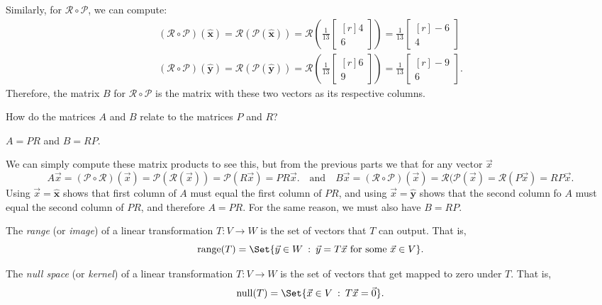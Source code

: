 \documentclass{problemset}
\DeclareMathOperator{\Range}{range}
\DeclareMathOperator{\Null}{null}
\newcommand{\xhat}{{\hat {\mathbf x}}}
\newcommand{\yhat}{{\hat {\mathbf y}}}
\newcommand{\mat}[1]{\begin{bmatrix*}[r]#1\end{bmatrix*}}
\providecommand\given{}
\newcommand\SetSymbol[1][]{%
	\nonscript\::%
	\allowbreak
	\nonscript\:
	\mathopen{}}
\renewcommand\given{\SetSymbol[\delimsize]}
\begin{document}
\begin{parts}
\begin{solution}
				Similarly, for $\mathcal R\circ \mathcal P$, we can compute:
				\begin{gather*}
					(\mathcal R\circ\mathcal P)(\xhat)
					=\mathcal R(\mathcal P(\xhat))
					=\mathcal R\left(\frac{1}{13}\mat{4\\6}\right)
					=\frac{1}{13}\mat{-6\\4} \\
					(\mathcal R\circ\mathcal P)(\yhat)
					=\mathcal R(\mathcal P(\yhat))
					=\mathcal R\left(\frac{1}{13}\mat{6\\9}\right)
					=\frac{1}{13}\mat{-9\\6}.
				\end{gather*}
				Therefore, the matrix $B$ for $\mathcal R\circ\mathcal P$ is the
				matrix with these two vectors as its respective columns. 
			\end{solution}
		\item How do the matrices $A$ and $B$ relate to the matrices $P$ and $R$?
			\begin{solution}
				$A = PR$ and $B = RP$. 

				We can simply compute these matrix products to see this, but
				from the previous parts we that for any vector $\vec x$
				\[
					A\vec x
					=(\mathcal P\circ\mathcal R)(\vec x)
					=\mathcal P(\mathcal R(\vec x))
					=\mathcal P(R\vec x)
					=PR\vec x.
					\quad \text{and} \quad
					B\vec x
					=(\mathcal R\circ\mathcal P)(\vec x)
					=\mathcal R(\mathcal P(\vec x)
					=\mathcal R(P\vec x)
					=RP\vec x.
				\]
				Using $\vec x = \xhat$ shows that first column of $A$ must equal
				the first column of $PR$, and using $\vec x = \yhat$ shows that
				the second column fo $A$ must equal the second column of $PR$,
				and therefore $A = PR$. For the same reason, we must also have $B=RP$.
			\end{solution}
				
	\end{parts}

	\begin{definition}[Range]
		The \emph{range} (or \emph{image}) of a linear transformation $T:V\to W$ 
		is the set of vectors that $T$ can output. That is,
		\[
			\Range(T)=\Set{\vec y\in W \given \vec y=T\vec x\text{ for some }\vec x\in V}.
		\]
	\end{definition}
	\begin{definition}
		The \emph{null space} (or \emph{kernel}) of a linear transformation $T:V\to W$
		is the set of vectors that get mapped to zero under $T$. That is,
		\[
			\Null(T)=\Set{\vec x\in V \given T\vec x=\vec 0}.
		\]
	\end{definition}
\end{document}
